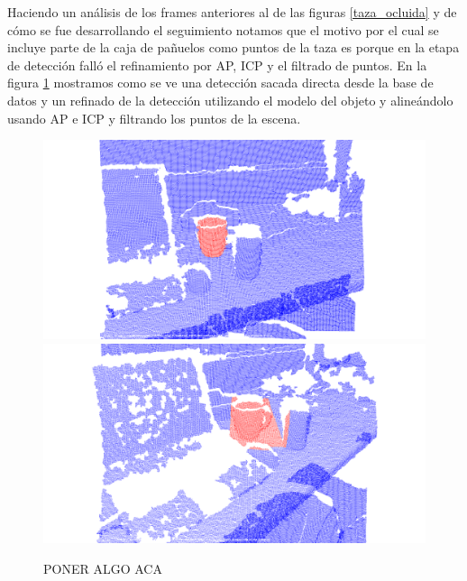 Haciendo un análisis de los frames anteriores al de las figuras \ref{taza_ocluida} y de cómo se fue desarrollando el seguimiento notamos que el motivo por el cual se incluye parte de la caja de pañuelos como puntos de la taza es porque en la etapa de detección falló el refinamiento por AP, ICP y el filtrado de puntos. En la figura \ref{filtro_en_deteccion} mostramos como se ve una detección sacada directa desde la base de datos y un refinado de la detección utilizando el modelo del objeto y alineándolo usando AP e ICP y filtrando los puntos de la escena.


\begin{figure}
	\centering
	\includegraphics[width=\textwidth]{img/taza_filtrado_exitoso_definitivo_depth_frame12.png}
	\includegraphics[width=\textwidth]{img/taza_filtrado_fallido_depth_simil_thresh_01_frame66.png}
	\caption{PONER ALGO ACA}
	\label{filtro_en_deteccion}
\end{figure}


